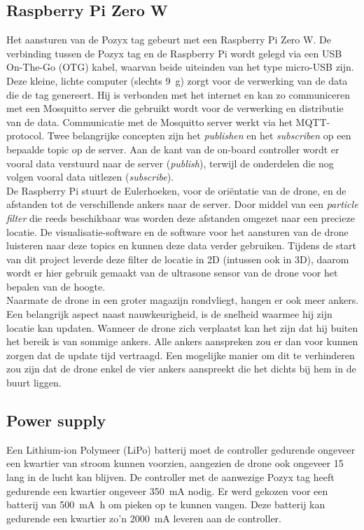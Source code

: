 \subsection{Raspberry Pi Zero W} \label{sec:zerow}
Het aansturen van de Pozyx tag gebeurt met een Raspberry Pi Zero W.
De verbinding tussen de Pozyx tag en de Raspberry Pi wordt gelegd via een USB On-The-Go (OTG) kabel, waarvan beide uiteinden van het type micro-USB zijn.
Deze kleine, lichte computer (slechts \SI{9}{\g}) zorgt voor de verwerking van de data die de tag genereert.
Hij is verbonden met het internet en kan zo communiceren met een Mosquitto server die gebruikt wordt voor de verwerking en distributie van de data.
Communicatie met de Mosquitto server werkt via het MQTT-protocol.
Twee belangrijke concepten zijn het \textit{publishen} en het \textit{subscriben} op een bepaalde topic op de server.
Aan de kant van de on-board controller wordt er vooral data verstuurd naar de server (\textit{publish}), terwijl de onderdelen die nog volgen vooral data uitlezen (\textit{subscribe}).\\

De Raspberry Pi stuurt de Eulerhoeken, voor de oriëntatie van de drone, en de afstanden tot de verschillende ankers naar de server.
Door middel van een \textit{particle filter} die reeds beschikbaar was worden deze afstanden omgezet naar een precieze locatie. De visualisatie-software en de software voor het aansturen van de drone luisteren naar deze topics en kunnen deze data verder gebruiken.
Tijdens de start van dit project leverde deze filter de locatie in 2D (intussen ook in 3D), daarom wordt er hier gebruik gemaakt van de ultrasone sensor van de drone voor het bepalen van de hoogte.\\

Naarmate de drone in een groter magazijn rondvliegt, hangen er ook meer ankers.
Een belangrijk aspect naast nauwkeurigheid, is de snelheid waarmee hij zijn locatie kan updaten.
Wanneer de drone zich verplaatst kan het zijn dat hij buiten het bereik is van sommige ankers.
Alle ankers aanspreken zou er dan voor kunnen zorgen dat de update tijd vertraagd.
Een mogelijke manier om dit te verhinderen zou zijn dat de drone enkel de vier ankers aanspreekt die het dichts bij hem in de buurt liggen.

\subsection{Power supply} \label{sec:power_supply}
Een Lithium-ion Polymeer (LiPo) batterij moet de controller gedurende ongeveer een kwartier van stroom kunnen voorzien, aangezien de drone ook ongeveer \SI{15}{\min} lang in de lucht kan blijven.
De controller met de aanwezige Pozyx tag heeft gedurende een kwartier ongeveer \SI{350}{\mA} nodig.
Er werd gekozen voor een batterij van \SI{500}{\mA\hour} om pieken op te kunnen vangen.
Deze batterij kan gedurende een kwartier zo'n \SI{2000}{\mA} leveren aan de controller.\\

